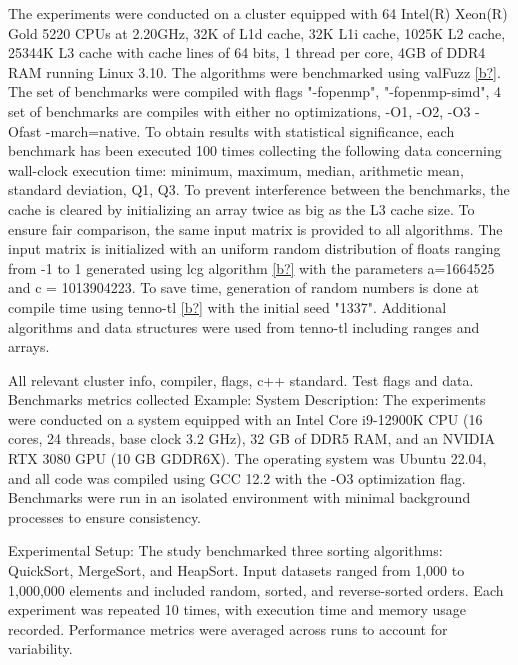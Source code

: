 \documentclass[conference]{IEEEtran}
\begin{document}
\iffalse
- Detailed description of the computing system and platform. \\
- Relevant specifications or configurations (e.g., libraries
and programming toolchains). \\
- Description of the experimental setup, procedures, and
methodologies used in the project. \\
- Discussion on how experiments are designed to test the hypotheses
or achieve the objectives \\
\fi

The experiments were conducted on a cluster equipped with 64 Intel(R) Xeon(R) Gold 5220 CPUs at 2.20GHz, 32K of L1d cache, 32K L1i cache, 1025K L2 cache, 25344K L3 cache with cache lines of 64 bits, 1 thread per core, 4GB of DDR4 RAM running Linux 3.10.
The algorithms were benchmarked using valFuzz \ref{b?}. The set of benchmarks were compiled with flags "-fopenmp", "-fopenmp-simd", 4 set of benchmarks are compiles with either no optimizations, -O1, -O2, -O3 -Ofast -march=native.
To obtain results with statistical significance, each benchmark has been executed 100 times collecting the following data concerning wall-clock execution time: minimum, maximum, median, arithmetic mean, standard deviation, Q1, Q3.
To prevent interference between the benchmarks, the cache is cleared by initializing an array twice as big as the L3 cache size.
To ensure fair comparison, the same input matrix is provided to all algorithms.
The input matrix is initialized with an uniform random distribution of floats ranging from -1 to 1 generated using lcg algorithm \ref{b?} with the parameters a=1664525 and c = 1013904223.
To save time, generation of random numbers is done at compile time using tenno-tl \ref{b?} with the initial seed "1337". Additional algorithms and data structures were used from tenno-tl including ranges and arrays.



All relevant cluster info, compiler, flags, c++ standard. Test flags and data. Benchmarks metrics collected
Example:
System Description:
The experiments were conducted on a system equipped with an Intel Core i9-12900K CPU (16 cores, 24 threads, base clock 3.2 GHz), 32 GB of DDR5 RAM, and an NVIDIA RTX 3080 GPU (10 GB GDDR6X). The operating system was Ubuntu 22.04, and all code was compiled using GCC 12.2 with the -O3 optimization flag. Benchmarks were run in an isolated environment with minimal background processes to ensure consistency.

Experimental Setup:
The study benchmarked three sorting algorithms: QuickSort, MergeSort, and HeapSort. Input datasets ranged from 1,000 to 1,000,000 elements and included random, sorted, and reverse-sorted orders. Each experiment was repeated 10 times, with execution time and memory usage recorded. Performance metrics were averaged across runs to account for variability.
\end{document}
